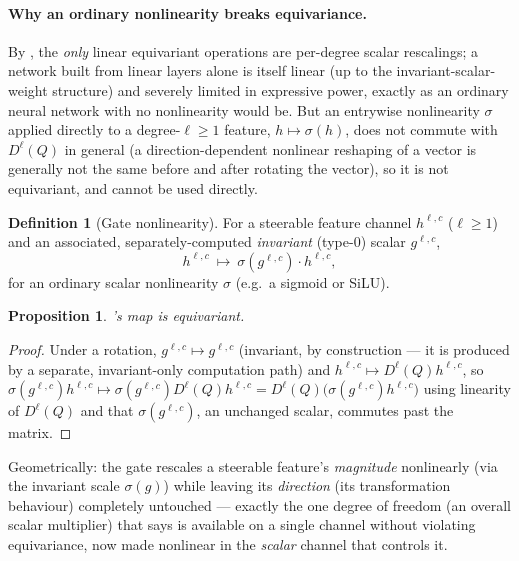 \documentclass[11pt,a4paper]{report}
\newtheorem{proposition}[proposition]{Proposition}
\theoremstyle{definition}
\newtheorem{definition}[definition]{Definition}
\theoremstyle{remark}
\begin{document}
\paragraph{Why an ordinary nonlinearity breaks equivariance.} By
, the \emph{only} linear equivariant operations
are per-degree scalar rescalings; a network built from linear layers alone
is itself linear (up to the invariant-scalar-weight structure) and
severely limited in expressive power, exactly as an ordinary neural network
with no nonlinearity would be. But an entrywise nonlinearity
$\sigma$ applied directly to a degree-$\ell\ge1$ feature, $h\mapsto\sigma(h)$,
does not commute with $D^\ell(Q)$ in general (a direction-dependent
nonlinear reshaping of a vector is generally not the same before and after
rotating the vector), so it is not equivariant, and cannot be used
directly.

\begin{definition}[Gate nonlinearity]
\label{def:gate-scratch}
For a steerable feature channel $h^{\ell,c}$ ($\ell\ge1$) and an associated,
separately-computed \emph{invariant} (type-$0$) scalar $g^{\ell,c}$,
\[
h^{\ell,c}\ \longmapsto\ \sigma(g^{\ell,c})\cdot h^{\ell,c},
\]
for an ordinary scalar nonlinearity $\sigma$ (e.g.\ a sigmoid or SiLU).
\end{definition}

\begin{proposition}
's map is equivariant.
\end{proposition}

\begin{proof}
Under a rotation, $g^{\ell,c}\mapsto g^{\ell,c}$ (invariant, by
construction --- it is produced by a separate, invariant-only computation
path) and $h^{\ell,c}\mapsto D^\ell(Q)h^{\ell,c}$, so
$\sigma(g^{\ell,c})h^{\ell,c}\mapsto\sigma(g^{\ell,c})D^\ell(Q)h^{\ell,c} = D^\ell(Q)\bigl(\sigma(g^{\ell,c})h^{\ell,c}\bigr)$
using linearity of $D^\ell(Q)$ and that $\sigma(g^{\ell,c})$, an unchanged
scalar, commutes past the matrix.
\end{proof}

Geometrically: the gate rescales a steerable feature's \emph{magnitude}
nonlinearly (via the invariant scale $\sigma(g)$) while leaving its
\emph{direction} (its transformation behaviour) completely untouched ---
exactly the one degree of freedom (an overall scalar multiplier) that
 says is available on a single channel without
violating equivariance, now made nonlinear in the \emph{scalar} channel
that controls it.
\end{document}
